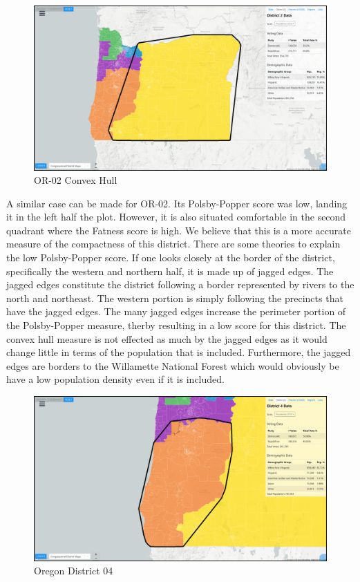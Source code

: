 \documentclass[letterpaper]{article}
\begin{document}
\begin{figure}[H]
	\includegraphics[width=\linewidth]{./figures/OR-02-ConvexHull.png}
	\caption{OR-02 Convex Hull}
	\label{fig:or02convexHull}
\end{figure}

A similar case can be made for OR-02. Its Polsby-Popper score was low, landing it in the left half the plot. However, it is also situated comfortable in the second quadrant where the Fatness score is high. We believe that this is a more accurate measure of the compactness of this district. There are some theories to explain the low Polsby-Popper score. If one looks closely at the border of the district, specifically the western and northern half, it is made up of jagged edges. The jagged edges constitute the district following a border represented by rivers to the north and northeast. The western portion is simply following the precincts that have the jagged edges. The many jagged edges increase the perimeter portion of the Polsby-Popper measure, therby resulting in a low score for this district. The convex hull measure is not effected as much by the jagged edges as it would change little in terms of the population that is included. Furthermore, the jagged edges are borders to the Willamette National Forest which would obviously be have a low population density even if it is included.

\begin{figure}[H]
	\includegraphics[width=\linewidth]{./figures/OR-04-ConvexHull.png}
	\caption{Oregon District 04}
	\label{fig:or04ch}
\end{figure}
\end{document}
